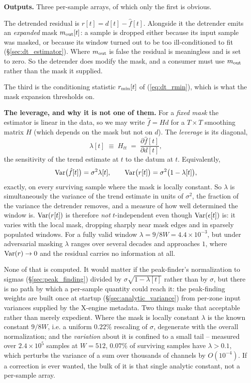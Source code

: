 \documentclass{article}
\numberwithin{equation}{section}   %
\begin{document}
{\bf Outputs.}  Three per-sample arrays, of which only the first is obvious.

The detrended residual is $r[t] = d[t] - \hat f[t]$.  Alongside it the detrender emits an {\em expanded} mask
$m_{\rm out}[t]$: a sample is dropped either because its input sample was masked, or because its window turned
out to be too ill-conditioned to fit (\S\ref{sec:dt_estimator}).  Where $m_{\rm out}$ is false the residual is
meaningless and is set to zero.  So the detrender does modify the mask, and a consumer must use
$m_{\rm out}$ rather than the mask it supplied.

The third is the conditioning statistic $r_{\rm min}[t]$ of (\ref{eq:dt_rmin}), which is what the mask
expansion thresholds on.

{\bf The leverage, and why it is not one of them.}  For a {\em fixed mask} the estimator is linear in the data,
so we may write $\hat f = Hd$ for a $T \times T$ smoothing matrix $H$ (which depends on the mask but not on
$d$).  The {\em leverage} is its diagonal,
\begin{equation}
\lambda[t] \;\equiv\; H_{tt} \;=\; \frac{\partial \hat f[t]}{\partial d[t]} ,
\label{eq:dt_leverage_def}
\end{equation}
the sensitivity of the trend estimate at $t$ to the datum at $t$.  Equivalently,
\begin{equation}
{\rm Var}\big(\hat f[t]\big) = \sigma^2 \lambda[t],
\qquad
{\rm Var}\big(r[t]\big) = \sigma^2 \big(1 - \lambda[t]\big) ,
\label{eq:dt_var_r}
\end{equation}
exactly, on every surviving sample where the mask is locally constant.  So $\lambda$ is simultaneously the
variance of the trend estimate in units of $\sigma^2$, the fraction of the variance the detrender removes, and
a measure of how well determined the window is.  ${\rm Var}(r[t])$ is therefore {\em not} $t$-independent even
though ${\rm Var}(\epsilon[t])$ is: it varies with the local mask, dropping sharply near mask edges and in
sparsely populated windows.  For a fully valid window $\lambda = 9/8W = 4.4\times10^{-3}$, but under
adversarial masking $\lambda$ ranges over several decades and approaches $1$, where
${\rm Var}(r) \rightarrow 0$ and the residual carries no information at all.

None of that is computed.  It would matter if the peak-finder's normalization to sigmas
(\S\ref{sec:peak_finding}) divided by $\sigma\sqrt{1-\lambda[t]}$ rather than by $\sigma$, but there is no path
by which a per-sample quantity could reach it: the peak-finding weights are built once at startup
(\S\ref{sec:analytic_variance}) from per-zone input variances supplied by the X-engine metadata.  Two things
make that acceptable rather than merely expedient.  Where the mask is locally constant $\lambda$ is the known
constant $9/8W$, i.e. a uniform $0.22\%$ rescaling of $\sigma$, degenerate with the overall normalization; and
the {\em variation} about it is confined to a small tail -- measured over $2.4\times10^5$ samples at $W=512$,
$0.07\%$ of surviving samples have $\lambda > 0.1$, which perturbs the variance of a sum over thousands of
channels by $O(10^{-4})$.  If a correction is ever wanted, the bulk of it is that single analytic constant, not
a per-sample array.
\end{document}
